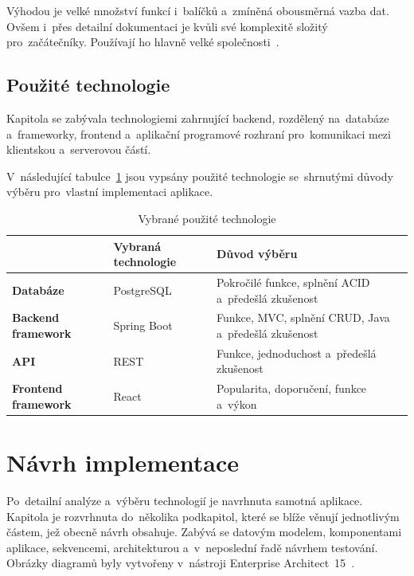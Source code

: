\documentclass[twoside]{ctuthesis}
\begin{document}
Výhodou je velké množství funkcí i~balíčků a~zmíněná obousměrná vazba dat. Ovšem i~přes detailní dokumentaci je kvůli své komplexitě složitý pro~začátečníky. Používají ho hlavně velké společnosti~\cite{simform, wad}.

\section{Použité technologie}

Kapitola se zabývala technologiemi zahrnující backend, rozdělený na~databáze a~frameworky, frontend a~aplikační programové rozhraní pro~komunikaci mezi klientskou a~serverovou částí.%


V~následující tabulce~\ref{tab:techshr} jsou vypsány použité technologie se~shrnutými důvody výběru pro~vlastní implementaci aplikace.

\begin{table}[H]
\caption{Vybrané použité technologie}
\begin{tabular}{| >{\centering\arraybackslash}m{3cm} | >{\centering\arraybackslash}m{4cm} | >{\centering\arraybackslash}m{5cm} |}
\hline
 & \textbf{Vybraná technologie} & \textbf{Důvod výběru} \\ \hline
\textbf{Databáze} & PostgreSQL & Pokročilé funkce, splnění ACID a~předešlá zkušenost \\ \hline
\textbf{Backend framework} & Spring Boot & Funkce, MVC, splnění CRUD, Java a~předešlá zkušenost \\ \hline
\textbf{API} & REST & Funkce, jednoduchost a~předešlá zkušenost \\ \hline
\textbf{Frontend framework} & React & Popularita, doporučení, funkce a~výkon \\ \hline
\end{tabular}
\label{tab:techshr}
\end{table}

\chapter{Návrh implementace}

Po~detailní analýze a~výběru technologií je navrhnuta samotná aplikace. Kapitola je rozvrhnuta do~několika podkapitol, které se blíže věnují jednotlivým částem, jež obecně návrh obsahuje. Zabývá se datovým modelem, komponentami aplikace, sekvencemi, architekturou a~v~neposlední řadě návrhem testování. Obrázky diagramů byly vytvořeny v~nástroji Enterprise Architect~15~\cite{ea}.
\end{document}
